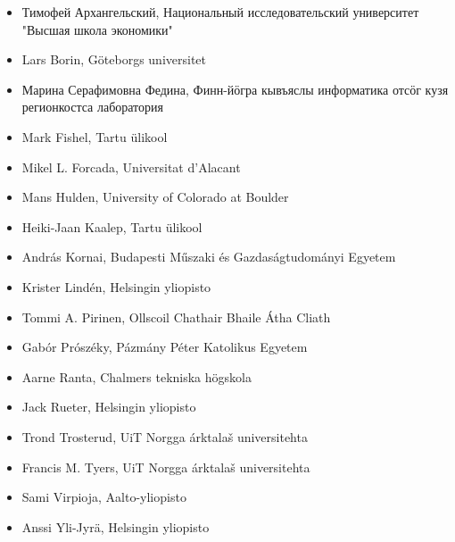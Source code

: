 \documentclass[b5paper]{book}
\begin{document}
\begin{itemize}
    \item Тимофей Архангельский, Национальный исследовательский университет "Высшая школа экономики"
    \item Lars Borin, Göteborgs universitet
    \item Марина Серафимовна Федина, Финн-йӧгра кывъяслы информатика отсӧг кузя регионкостса лаборатория
    \item Mark Fishel, Tartu ülikool
    \item Mikel L. Forcada, Universitat d'Alacant
    \item Mans Hulden, University of Colorado at Boulder
    \item Heiki-Jaan Kaalep, Tartu ülikool
    \item András Kornai, Budapesti Műszaki és Gazdaságtudományi Egyetem
    \item Krister Lindén, Helsingin yliopisto
    \item Tommi A. Pirinen, Ollscoil Chathair Bhaile Átha Cliath
    \item Gabór Prószéky, Pázmány Péter Katolikus Egyetem
    \item Aarne Ranta, Chalmers tekniska högskola
    \item Jack Rueter, Helsingin yliopisto
    \item Trond Trosterud, UiT Norgga árktalaš universitehta
    \item Francis M. Tyers, UiT Norgga árktalaš universitehta
    \item Sami Virpioja, Aalto-yliopisto
    \item Anssi Yli-Jyrä, Helsingin yliopisto
\end{itemize}

\tableofcontents

\mainmatter

\end{document}
